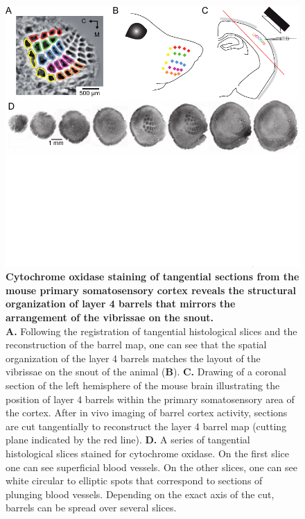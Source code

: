 \begin{figure}[!ht]
\centering
\includegraphics[width=140mm]{images/Perronnet-Figure1}
\caption{
	\textbf{Cytochrome oxidase staining of tangential sections from the mouse primary somatosensory cortex reveals the structural organization of layer 4 barrels that mirrors the arrangement of the vibrissae on 
	the snout.}\\
	\textbf{A.} Following the registration of tangential histological slices and the reconstruction of the barrel map, one can see that the spatial organization of the layer 4 barrels matches the layout of the vibrissae on the snout of the animal (\textbf{B}).  
	\textbf{C.} Drawing of a coronal section of the left hemisphere of the mouse brain illustrating the position of layer 4 barrels within the primary somatosensory area of the cortex. After in vivo imaging of barrel cortex activity, sections are cut tangentially to reconstruct the layer 4 barrel map (cutting plane indicated by the red line).  
	\textbf{D.} A series of tangential histological slices stained for cytochrome oxidase. On the first slice one can see superficial blood vessels. On the other slices, one can see white circular to elliptic spots that correspond to sections of plunging blood vessels. Depending on the exact axis of the cut, barrels can be spread over several slices.
}
\label{somatotopy}  
\end{figure}

